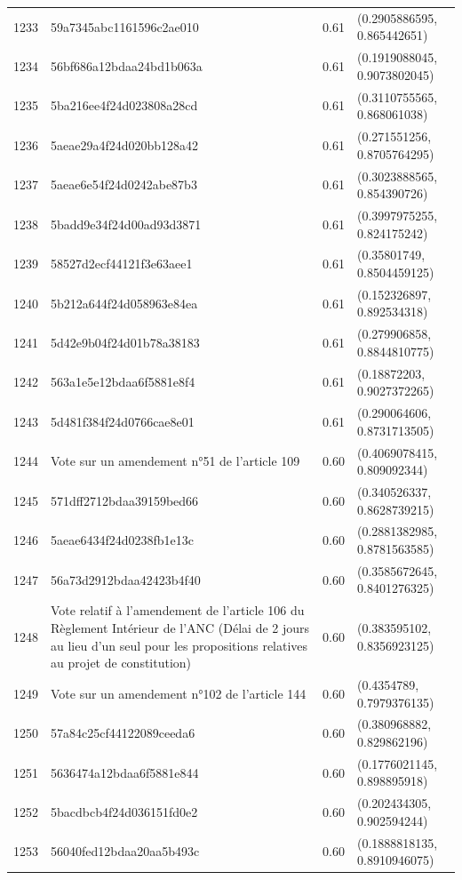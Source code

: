\begin{table}[ht]
\begin{tabular}{rlrl}
  1233 & 59a7345abc1161596c2ae010 & 0.61 & (0.2905886595, 0.865442651) \\ 
  1234 & 56bf686a12bdaa24bd1b063a & 0.61 & (0.1919088045, 0.9073802045) \\ 
  1235 & 5ba216ee4f24d023808a28cd & 0.61 & (0.3110755565, 0.868061038) \\ 
  1236 & 5aeae29a4f24d020bb128a42 & 0.61 & (0.271551256, 0.8705764295) \\ 
  1237 & 5aeae6e54f24d0242abe87b3 & 0.61 & (0.3023888565, 0.854390726) \\ 
  1238 & 5badd9e34f24d00ad93d3871 & 0.61 & (0.3997975255, 0.824175242) \\ 
  1239 & 58527d2ecf44121f3e63aee1 & 0.61 & (0.35801749, 0.8504459125) \\ 
  1240 & 5b212a644f24d058963e84ea & 0.61 & (0.152326897, 0.892534318) \\ 
  1241 & 5d42e9b04f24d01b78a38183 & 0.61 & (0.279906858, 0.8844810775) \\ 
  1242 & 563a1e5e12bdaa6f5881e8f4 & 0.61 & (0.18872203, 0.9027372265) \\ 
  1243 & 5d481f384f24d0766cae8e01 & 0.61 & (0.290064606, 0.8731713505) \\ 
  1244 & Vote sur un amendement n°51 de l'article 109 & 0.60 & (0.4069078415, 0.809092344) \\ 
  1245 & 571dff2712bdaa39159bed66 & 0.60 & (0.340526337, 0.8628739215) \\ 
  1246 & 5aeae6434f24d0238fb1e13c & 0.60 & (0.2881382985, 0.8781563585) \\ 
  1247 & 56a73d2912bdaa42423b4f40 & 0.60 & (0.3585672645, 0.8401276325) \\ 
  1248 & Vote relatif à l'amendement de l'article 106 du Règlement Intérieur de l'ANC (Délai de 2 jours au lieu d'un seul pour les propositions relatives au projet de constitution) & 0.60 & (0.383595102, 0.8356923125) \\ 
  1249 & Vote sur un amendement n°102 de l'article 144 & 0.60 & (0.4354789, 0.7979376135) \\ 
  1250 & 57a84c25cf44122089ceeda6 & 0.60 & (0.380968882, 0.829862196) \\ 
  1251 & 5636474a12bdaa6f5881e844 & 0.60 & (0.1776021145, 0.898895918) \\ 
  1252 & 5bacdbcb4f24d036151fd0e2 & 0.60 & (0.202434305, 0.902594244) \\ 
  1253 & 56040fed12bdaa20aa5b493c & 0.60 & (0.1888818135, 0.8910946075) \\ 

\end{tabular}
\end{table}
